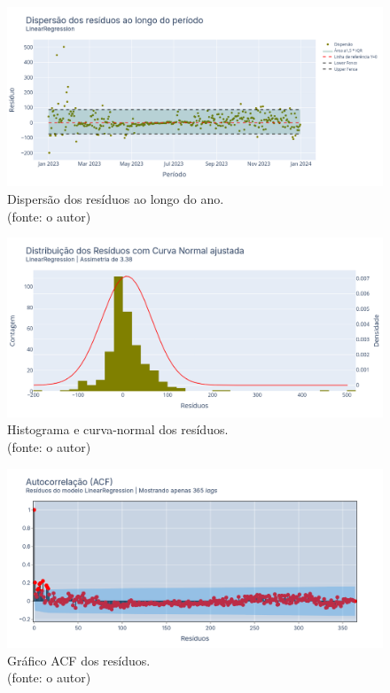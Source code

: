 \begin{figure}[!h]
\centering
\includegraphics[scale=0.33]{Figuras/jequiti/resultados/LR_WFV_SCLD_RESID_x_TEMPO.png}
\caption{Dispersão dos resíduos ao longo do ano.\\(fonte: o autor)}
\label{fig:jequiti_LR_WFV_SCLD_RESID_x_TEMPO}
\end{figure}

\begin{figure}[!h]
\centering
\includegraphics[scale=0.33]{Figuras/jequiti/resultados/LR_WFV_SCLD_RESID_x_CURVA_NORMAL.png}
\caption{Histograma e curva-normal dos resíduos.\\(fonte: o autor)}
\label{fig:jequiti_LR_WFV_SCLD_RESID_x_CURVA_NORMAL}
\end{figure}

\begin{figure}[!h]
\centering
\includegraphics[scale=0.33]{Figuras/jequiti/resultados/LR_WFV_SCLD_RESID_ACF.png}
\caption{Gráfico ACF dos resíduos.\\(fonte: o autor)}
\label{fig:jequiti_LR_WFV_SCLD_RESID_ACF}
\end{figure}
\clearpage

